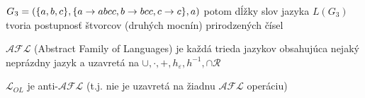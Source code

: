 \begin{priklad}
$G_{3}=(\{a,b,c\},\{a\rightarrow abcc,b\rightarrow bcc,c\rightarrow c\},a)$ potom dĺžky
slov jazyka $L(G_{3})$ tvoria postupnosť štvorcov (druhých mocnín)
prirodzených čísel
\end{priklad}

\begin{definicia}
$\mathcal{AFL}$ (Abstract Family of Languages) je každá trieda
jazykov obsahujúca nejaký neprázdny jazyk a uzavretá na
$\cup,\cdot,+,h_{\varepsilon},h^{-1},\cap\mathcal{R}$
\end{definicia}

\begin{veta}
$\mathcal{L}_{OL}$ je anti-$\mathcal{AFL}$ (t.j. nie je uzavretá
na žiadnu $\mathcal{AFL}$ operáciu)
\end{veta}


